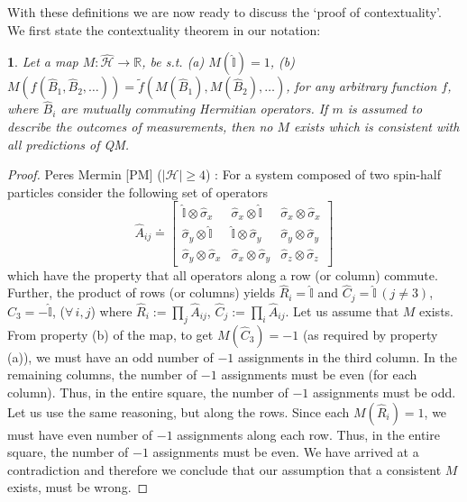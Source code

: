 \documentclass[british,aps,prl,superscriptaddress,nofootinbib,times,reprint]{revtex4-1}
\theoremstyle{plain}
\theoremstyle{plain}
\newtheorem*{thm*}{\protect\theoremname}
\theoremstyle{definition}
\theoremstyle{remark}
\theoremstyle{remark}
\theoremstyle{remark}
\theoremstyle{plain}
\theoremstyle{plain}
\theoremstyle{plain}
\theoremstyle{definition}
\theoremstyle{definition}
\providecommand{\theoremname}{Theorem}
\begin{document}
With these definitions we are now ready to discuss
the `proof of contextuality'. We first state the
contextuality theorem in our notation:
\begin{thm*} Let a map
$M:\hat{\mathcal{H}}\to\mathbb{R}$, be s.t. (a)
$M(\hat{\mathbb{I}})=1$, (b)
$M(f(\hat{B}_{1},\hat{B}_{2},\dots))=\tilde
f(M(\hat{B}_{1}),M(\hat{B}_{2}),\dots)$, for any
arbitrary function $f$, where $\hat{B}_{i}$ are
mutually commuting Hermitian operators. If $m$ is
assumed to describe the outcomes of measurements,
then no $M$ exists which is consistent with all
predictions of QM. 
\label{thm:KS}
\end{thm*}

\begin{proof} Peres Mermin [PM]
($\left|\mathcal{H}\right|\ge4$)
\cite{Peres,Mermin}:
For a system composed of two spin-half particles 
consider the following set of operators \[
\hat{A}_{ij}\doteq\left[\begin{array}{ccc}
\hat{\mathbb{I}}\otimes\hat{\sigma}_{x} &
\hat{\sigma}_{x}\otimes\hat{\mathbb{I}} &
\hat{\sigma}_{x}\otimes\hat{\sigma}_{x}\\
\hat{\sigma}_{y}\otimes\hat{\mathbb{I}} &
\hat{\mathbb{I}}\otimes\hat{\sigma}_{y} &
\hat{\sigma}_{y}\otimes\hat{\sigma}_{y}\\
\hat{\sigma}_{y}\otimes\hat{\sigma}_{x} &
\hat{\sigma}_{x}\otimes\hat{\sigma}_{y} &
\hat{\sigma}_{z}\otimes\hat{\sigma}_{z}
\end{array}\right] \] which have the property that
all operators along a row (or column) commute. Further,
the product of rows (or columns) yields
$\hat{R}_{i}=\hat{\mathbb{I}}$ and
$\hat{C}_{j}=\hat{\mathbb{I}}\,(j\neq3)$,
$\hat{C}_{3}=-\hat{\mathbb{I}}$, ($\forall\,i,j$) where
$\hat{R}_{i}:=\prod_{j}\hat{A}_{ij}$,
$\hat{C}_{j}:=\prod_{i}\hat{A}_{ij}$. Let us
assume that $M$ exists. From property (b) of the
map, to get $M(\hat{C}_{3})=-1$ (as required by
property (a)), we must have an odd number of $-1$
assignments in the third column. In the remaining
columns, the number of $-1$ assignments must be
even (for each column). Thus, in the entire
square, the number of $-1$ assignments must be
odd. Let us use the same reasoning, but along the
rows. Since each $M(\hat{R}_{i})=1$, we must have
even number of $-1$ assignments along each row.
Thus, in the entire square, the number of $-1$
assignments must be even. We have arrived at a
contradiction and therefore we conclude that our
assumption that a consistent $M$ exists, must be
wrong.  \end{proof}
\end{document}
